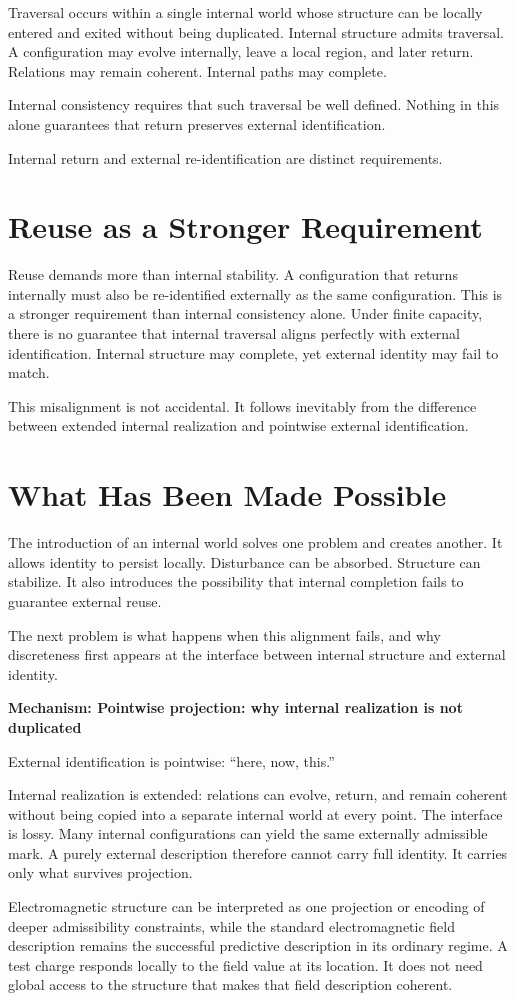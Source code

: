 \documentclass[11pt,twoside,openright]{book}
\newenvironment{mechanismbox}[1]
  {\begin{framed}\noindent\textbf{Mechanism: #1}\par\medskip}
  {\end{framed}}
\begin{document}
Traversal occurs within a single internal world whose structure can be locally entered and exited without being duplicated. Internal structure admits traversal. A configuration may evolve internally, leave a local region, and later return. Relations may remain coherent. Internal paths may complete.

Internal consistency requires that such traversal be well defined. Nothing in this alone guarantees that return preserves external identification.

Internal return
and external re-identification
are distinct requirements.
\section*{Reuse as a Stronger Requirement}

Reuse demands more than internal stability. A configuration that returns internally must also be re-identified externally as the same configuration. This is a stronger requirement than internal consistency alone. Under finite capacity, there is no guarantee that internal traversal aligns perfectly with external identification. Internal structure may complete, yet external identity may fail to match.

This misalignment
is not accidental.
It follows inevitably
from the difference
between extended internal realization
and pointwise
external identification.
\section*{What Has Been Made Possible}

The introduction of an internal world solves one problem and creates another. It allows identity to persist locally. Disturbance can be absorbed. Structure can stabilize. It also introduces the possibility that internal completion fails to guarantee external reuse.

The next problem is
what happens
when this alignment fails,
and why discreteness
first appears
at the interface
between internal structure
and external identity.
 
\begin{mechanismbox}{Pointwise projection: why internal realization is not duplicated}
External identification is pointwise:
``here, now, this.''

Internal realization is extended: relations can evolve, return, and remain coherent without being copied into a separate internal world at every point. The interface is lossy. Many internal configurations can yield the same externally admissible mark. A purely external description therefore cannot carry full identity. It carries only what survives projection.

Electromagnetic structure can be interpreted as one projection or encoding
of deeper admissibility constraints,
while the standard electromagnetic field description remains the successful
predictive description in its ordinary regime.
A test charge responds locally to the field value at its location.
It does not need global access
to the structure that makes that field description coherent.
\end{mechanismbox}
\end{document}
